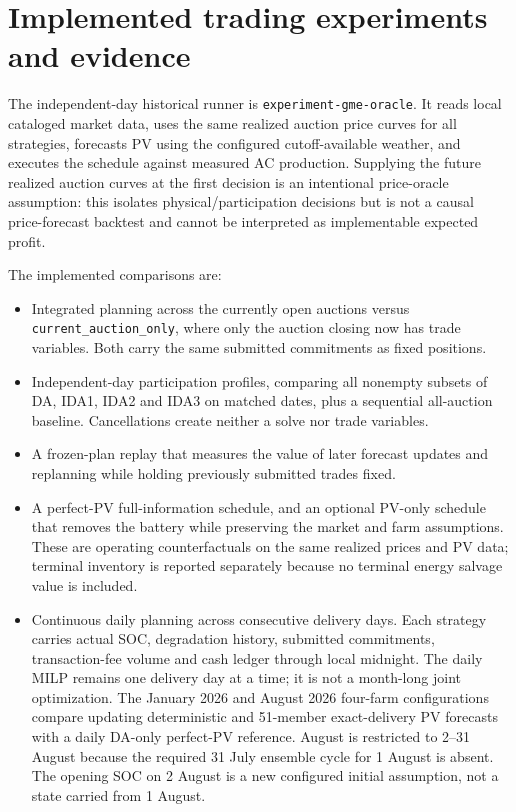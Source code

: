 \documentclass[11pt,a4paper]{article}
\begin{document}
\section{Implemented trading experiments and evidence}

The independent-day historical runner is \texttt{experiment-gme-oracle}. It reads
local cataloged market data, uses the same realized auction price curves for all
strategies, forecasts PV using the configured cutoff-available weather, and
executes the schedule against measured AC production. Supplying the future
realized auction curves at the first decision is an intentional price-oracle
assumption: this isolates physical/participation decisions but is not a causal
price-forecast backtest and cannot be interpreted as implementable expected
profit.

The implemented comparisons are:
\begin{itemize}
\item Integrated planning across the currently open auctions versus
\texttt{current\_auction\_only}, where only the auction closing now has trade
variables. Both carry the same submitted commitments as fixed positions.
\item Independent-day participation profiles, comparing all nonempty subsets
of DA, IDA1, IDA2 and IDA3 on matched dates, plus a sequential all-auction
baseline. Cancellations create neither a solve nor trade variables.
\item A frozen-plan replay that measures the value of later forecast updates
and replanning while holding previously submitted trades fixed.
\item A perfect-PV full-information schedule, and an optional PV-only schedule
that removes the battery while preserving the market and farm assumptions.
These are operating counterfactuals on the same realized prices and PV data;
terminal inventory is reported separately because no terminal energy salvage
value is included.
\item Continuous daily planning across consecutive delivery days. Each
strategy carries actual SOC, degradation history, submitted commitments,
transaction-fee volume and cash ledger through local midnight. The daily MILP
remains one delivery day at a time; it is not a month-long joint optimization.
The January 2026 and August 2026 four-farm configurations compare updating
deterministic and 51-member exact-delivery PV forecasts with a daily DA-only
perfect-PV reference. August is restricted to 2--31 August because the required
31 July ensemble cycle for 1 August is absent. The opening SOC on 2 August is a
new configured initial assumption, not a state carried from 1 August.
\end{itemize}
\end{document}
